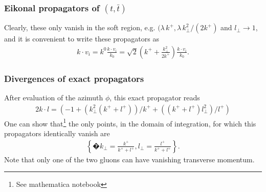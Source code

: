\documentclass[a4paper,11pt]{article}
\numberwithin{equation}{section}
\begin{document}
\subsubsection{Eikonal propagators of $(t,\bar{t})$}

Clearly, these only vanish in the soft region, e.g. $(\lambda\, k^+,\lambda\, k_\perp^2/(2k^+)$ and $l_\perp\to 1$, and it is convenient to write these propagators as
\begin{align}
k\cdot v_i= k^0   \frac{k \cdot v_i}{k_0} = \sqrt{2}\left(k^++\frac{k_\perp^2}{2k^+}\right)   \frac{k \cdot v_i}{k_0}.
\end{align} 

\subsubsection{Divergences of exact propagators}

After evaluation of the azimuth $\phi$, this exact propagator reads
%
\begin{align}
2k\cdot l=   \left(-1 + (k_\perp^2 (k^+ + l^+))/k^+ + ((k^+ + l^+) l_\perp^2)/l^+\right)
\end{align}
%
One can show that\footnote{See mathematica notebook} the only points, in the domain of integration, for which 
this propagators identically vanish are
\begin{align}
\left\{�k_\perp=\frac{k^+}{k^+ + l^+}, l_\perp=\frac{l^+}{k^+ + l^+} \right\}.
\end{align}
Note that only one of the two gluons can have vanishing transverse momentum.
\end{document}
